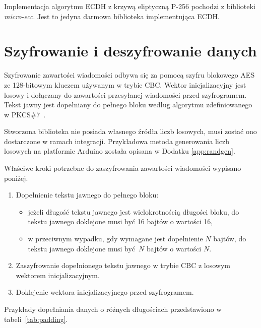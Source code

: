 Implementacja algorytmu ECDH z krzywą eliptyczną P-256 pochodzi z biblioteki \emph{micro-ecc}. Jest to jedyna darmowa biblioteka implementująca ECDH.

\section{Szyfrowanie i deszyfrowanie danych}
\label{sec:encrypt}

Szyfrowanie zawartości wiadomości odbywa się za pomocą szyfru blokowego AES ze 128-bitowym kluczem używanym w trybie CBC. Wektor inicjalizacyjny jest losowy i dołączany do zawartości przesyłanej wiadomości przed szyfrogramem. Tekst jawny jest dopełniany do pełnego bloku według algorytmu zdefiniowanego w PKCS\#7~\cite{kaliski1998pkcs}.

Stworzona biblioteka nie posiada własnego źródła liczb losowych, musi zostać ono dostarczone w ramach integracji. Przykładowa metoda generowania liczb losowych na platformie Arduino została opisana w Dodatku \ref{app:randgen}.

Właściwe kroki potrzebne do zaszyfrowania zawartości wiadomości wypisano poniżej.

\begin{enumerate}
\item Dopełnienie tekstu jawnego do pełnego bloku:
\begin{itemize}
\item jeżeli długość tekstu jawnego jest wielokrotnością długości bloku, do tekstu jawnego doklejone musi być 16 bajtów o wartości 16,
\item w przeciwnym wypadku, gdy wymagane jest dopełnienie $ N $ bajtów, do tekstu jawnego doklejone musi być $ N $ bajtów o wartości $ N $.
\end{itemize}
\item Zaszyfrowanie dopełnionego tekstu jawnego w trybie CBC z losowym wektorem inicjalizacyjnym.
\item Doklejenie wektora inicjalizacyjnego przed szyfrogramem.
\end{enumerate}

Przykłady dopełniania danych o różnych długościach przedstawiono w tabeli~\ref{tab:padding}.

